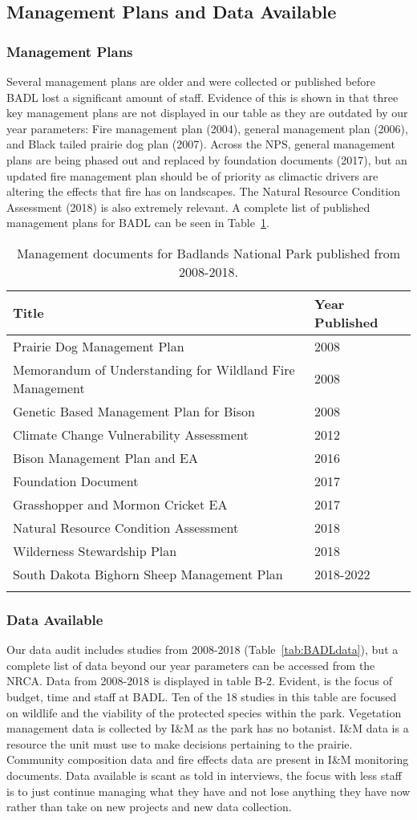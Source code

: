 \subsection{Management Plans and Data Available}

\subsubsection{Management Plans}

Several management plans are older and were collected or published before BADL lost a significant amount of staff.
Evidence of this is shown in that three key management plans are not displayed in our table as they are outdated by our year parameters: Fire management plan (2004), general management plan (2006), and Black tailed prairie dog
plan (2007). 
Across the NPS, general management plans are being phased out and replaced by foundation documents (2017), but an updated fire management plan should be of priority as climactic drivers are altering the effects that fire has on landscapes. 
The Natural Resource Condition Assessment (2018) is also extremely relevant.
A complete list of published management plans for BADL can be seen in Table~\ref{tab:BADLManDocs}.

\begin{longtable}[]{@{}ll@{}}
\toprule
Title & Year Published\tabularnewline
\midrule
\endhead
Prairie Dog Management Plan & 2008 \tabularnewline
Memorandum of Understanding for Wildland Fire Management & 2008 \tabularnewline
Genetic Based Management Plan for Bison & 2008 \tabularnewline
Climate Change Vulnerability Assessment & 2012 \tabularnewline
Bison Management Plan and EA & 2016 \tabularnewline
Foundation Document & 2017 \tabularnewline
Grasshopper and Mormon Cricket EA  & 2017 \tabularnewline
Natural Resource Condition Assessment & 2018 \tabularnewline
Wilderness Stewardship Plan & 2018 \tabularnewline
South Dakota Bighorn Sheep Management Plan & 2018-2022 \tabularnewline
\bottomrule
\caption{Management documents for Badlands National Park published from 2008-2018.} 
\label{tab:BADLManDocs}
\end{longtable}

\subsubsection{Data Available}

Our data audit includes studies from 2008-2018 (Table~\ref{tab:BADLdata}), but a complete list of data beyond our year parameters can be accessed from the NRCA. 
Data from 2008-2018 is displayed in table B-2. Evident, is the focus of budget,
time and staff at BADL. Ten of the 18 studies in this table are focused
on wildlife and the viability of the protected species within the park.
Vegetation management data is collected by I\&M as the park has no
botanist. I\&M data is a resource the unit must use to make decisions
pertaining to the prairie. Community composition data and fire effects
data are present in I\&M monitoring documents. Data available is scant
as told in interviews, the focus with less staff is to just continue
managing what they have and not lose anything they have now rather than
take on new projects and new data collection.

